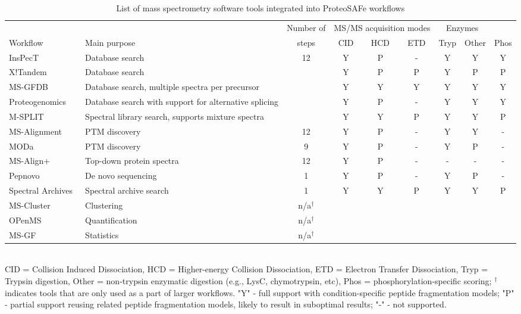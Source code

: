 \documentclass[arial,11pt]{article}
\newcommand{\SF}[1]{\textsf{#1}}
\newcommand{\SYSTEM}[0]{\SF{ProteoSAFe}\xspace}
\begin{document}
\footnotesize
\begin{table}[htb!]
\footnotesize
\begin{tabular}{lp{1.5in}ccccccc}
& & Number of & \multicolumn{3}{c}{MS/MS acquisition modes} & \multicolumn{2}{c}{Enzymes}\\
\cline{4-6}\cline{7-9}
Workflow & Main purpose & steps & CID & HCD & ETD & Tryp & Other & Phos \\
\hline
InsPecT~\cite{Tanner:2005} & Database search & 12 & Y & P & \-- & Y & Y & Y \\
X!Tandem~\cite{Craig:2004} & Database search  &    & Y & P & P   & Y & P & P \\
MS-GFDB~\cite{Kim:2010} & Database search, multiple spectra per precursor
                                                &    & Y & Y & Y   & Y & Y & Y \\
Proteogenomics~\cite{Castellana:2010} & Database search with support for alternative splicing
                                                &    & Y & P & \-- & Y & Y & Y \\
%
M-SPLIT~\cite{Wang:2010} & Spectral library search, supports mixture spectra
                                                &    & Y & Y & P   & Y & Y & P \\
%
MS-Alignment~\cite{Tsur:2005} & PTM discovery  & 12 & Y & P & \-- & Y & Y & \-- \\
MODa~\cite{Na:2010}  & PTM discovery            &  9 & Y & P & \-- & Y & P & \-- \\
%
MS-Align+~\cite{Liu:2010} & Top-down protein spectra
                                                & 12 & Y & P & \-- & \-- & \-- & \-- \\
%
Pepnovo~\cite{Frank:2005} & De novo sequencing & 1& Y & P & \-- & Y & P & \-- \\
Spectral Archives~\cite{Frank:2011} & Spectral archive search
                                                & 1  & Y & Y & P   & Y & Y & P \\
%
MS-Cluster~\cite{Frank:2008} & Clustering & n/a$^\dagger$ & \\
OPenMS~\cite{Reinert:2010} & Quantification & n/a$^\dagger$ & \\
MS-GF~\cite{Kim:2008} & Statistics & n/a$^\dagger$ & \\
\hline
\end{tabular}
\\
\scriptsize CID = Collision Induced Dissociation, HCD = Higher-energy Collision Dissociation, ETD = Electron Transfer Dissociation, Tryp = Trypsin digestion, Other = non-trypsin enzymatic digestion (e.g., LysC, chymotrypsin, etc), Phos = phosphorylation-specific scoring; $^\dagger$ indicates tools that are only used as a part of larger workflows. "Y" - full support with condition-specific peptide fragmentation models; "P" - partial support reusing related peptide fragmentation models, likely to result in suboptimal results; "\--" - not supported.
\caption{\footnotesize List of mass spectrometry software tools integrated into \SYSTEM workflows} \label{tab:workflows}
\end{table}
\normalsize
\end{document}
